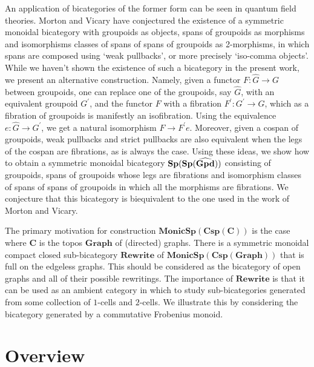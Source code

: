 \documentclass[11pt]{amsart}
\newcommand{\cat}[1]{\mathbf{#1}}
\newcommand{\bimonspcsp}[1]{\mathbf{MonicSp(Csp(#1))}}
\theoremstyle{remark}
\theoremstyle{definition}
\begin{document}
{An application of bicategories of the former form can be seen in quantum field theories. Morton and Vicary \cite{MortVic} have conjectured the existence of a symmetric monoidal bicategory with groupoids as objects, spans of groupoids as morphisms and isomorphisms classes of spans of spans of groupoids as 2-morphisms, in which spans are composed using `weak pullbacks', or more precisely `iso-comma objects'. While we haven't shown the existence of such a bicategory in the present work, we present an alternative construction. Namely, given a functor $F \colon \hat{G} \to G$ between groupoids, one can replace one of the groupoids, say $\hat{G}$, with an equivalent groupoid $G^\prime$, and the functor $F$ with a fibration $F^\prime \colon G^\prime \to G$, which as a fibration of groupoids is manifestly an isofibration. Using the equivalence $e \colon \hat{G} \to G^\prime$, we get a natural isomorphism $F \to F^\prime e$. Moreover, given a cospan of groupoids, weak pullbacks and strict pullbacks are also equivalent when the legs of the cospan are fibrations, as is always the case. Using these ideas, we show how to obtain a symmetric monoidal bicategory $\bold{Sp(Sp(\widehat{Gpd}))}$ consisting of groupoids, spans of groupoids whose legs are fibrations and isomorphism classes of spans of spans of groupoids in which all the morphisms are fibrations. We conjecture that this bicategory is biequivalent to the one used in the work of Morton and Vicary.
}


The primary motivation for construction $\bimonspcsp{C}$ is the case where $\cat{C}$ is the topos $\cat{Graph}$ of (directed) graphs.  There is a symmetric monoidal compact closed sub-bicategory $\cat{Rewrite}$ of $\bimonspcsp{Graph}$ that is full on the edgeless graphs.  This should be considered as the bicategory of open graphs and all of their possible rewritings. The importance of $\cat{Rewrite}$ is that it can be used as an ambient category in which to study sub-bicategories generated from some collection of $1$-cells and $2$-cells.  We illustrate this by considering the bicategory generated by a commutative Frobenius monoid.


\section{Overview} %
\label{sec:Overview}
\end{document}
